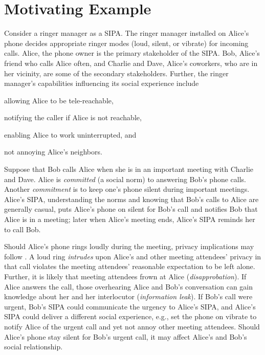 \section{Motivating Example}
\label{sec:intro-example}

\begin{example}
\label{ex:intro-ringer-meeting} 
Consider a ringer manager as a SIPA. The ringer manager installed on 
Alice's phone decides appropriate ringer modes (loud, silent, or 
vibrate) for incoming calls. Alice, the phone owner is the 
primary stakeholder of the SIPA. Bob, Alice's friend who 
calls Alice often, and Charlie and Dave, Alice's coworkers, who are in 
her vicinity, are some of the secondary stakeholders. Further, the ringer 
manager's capabilities influencing its social experience include
\begin{enumerate*}[label=(\arabic*)]
\item allowing Alice to be tele-reachable, 
\item notifying the caller if Alice is not reachable,
\item enabling Alice to work uninterrupted, and
\item not annoying Alice's neighbors.
\end{enumerate*}
\end{example}

Suppose that Bob calls Alice when she is in an important meeting with
Charlie and Dave. Alice is \emph{committed} (a social norm)
to answering Bob's phone calls. Another \emph{commitment} is to keep
one's phone silent during important meetings. Alice's SIPA,
understanding the norms and knowing that Bob's calls to Alice are
generally casual, puts Alice's phone on silent for Bob's call and
notifies Bob that Alice is in a meeting; later when Alice's meeting
ends, Alice's SIPA reminds her to call Bob.

Should Alice's phone rings loudly during the meeting, privacy
implications may follow
\citep{Murukannaiah-IC16-Engineering,solove-2006-taxonomy}. A loud ring
\emph{intrudes} upon Alice's and other meeting attendees' privacy in
that call violates the meeting attendees' reasonable expectation to be
left alone. Further, it is likely that meeting attendees frown at Alice
(\emph{disapprobation}). If Alice answers the call, those overhearing
Alice and Bob's conversation can gain knowledge about her and her
interlocutor (\emph{information leak}). If Bob's call were urgent, Bob's
SIPA could communicate the urgency to Alice's SIPA, and Alice's SIPA
could deliver a different social experience, e.g., set the phone on vibrate
to notify Alice of the urgent call and yet not annoy other meeting attendees.
Should Alice's phone stay silent for Bob's urgent call, it may affect
Alice's and Bob's social relationship.

